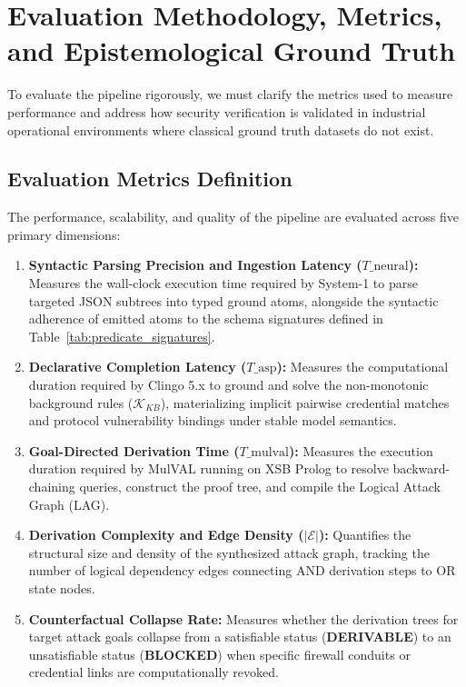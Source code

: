 \documentclass[target=mst,aauheader=aics,style=]{thud}
\begin{document}
\section{Evaluation Methodology, Metrics, and Epistemological Ground Truth}
\label{sec:methodology_ground_truth}

To evaluate the pipeline rigorously, we must clarify the metrics used to measure performance and address how security verification is validated in industrial operational environments where classical ground truth datasets do not exist.

\subsection{Evaluation Metrics Definition}
The performance, scalability, and quality of the pipeline are evaluated across five primary dimensions:
\begin{enumerate}
    \item \textbf{Syntactic Parsing Precision and Ingestion Latency ($T\_{\text{neural}}$):} Measures the wall-clock execution time required by System-1 to parse targeted JSON subtrees into typed ground atoms, alongside the syntactic adherence of emitted atoms to the schema signatures defined in Table~\ref{tab:predicate_signatures}.
    \item \textbf{Declarative Completion Latency ($T\_{\text{asp}}$):} Measures the computational duration required by Clingo 5.x to ground and solve the non-monotonic background rules ($\mathcal{K}_{KB}$), materializing implicit pairwise credential matches and protocol vulnerability bindings under stable model semantics.
    \item \textbf{Goal-Directed Derivation Time ($T\_{\text{mulval}}$):} Measures the execution duration required by MulVAL running on XSB Prolog to resolve backward-chaining queries, construct the proof tree, and compile the Logical Attack Graph (LAG).
    \item \textbf{Derivation Complexity and Edge Density ($\vert{}\mathcal{E}\vert{}$):} Quantifies the structural size and density of the synthesized attack graph, tracking the number of logical dependency edges connecting AND derivation steps to OR state nodes.
    \item \textbf{Counterfactual Collapse Rate:} Measures whether the derivation trees for target attack goals collapse from a satisfiable status (\textbf{DERIVABLE}) to an unsatisfiable status (\textbf{BLOCKED}) when specific firewall conduits or credential links are computationally revoked.
\end{enumerate}
\end{document}
